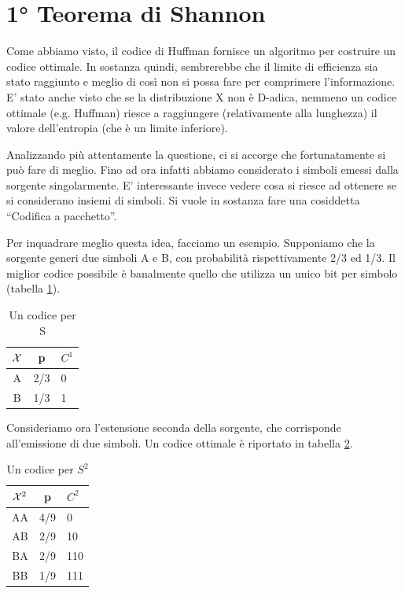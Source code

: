 \section{1° Teorema di Shannon}
Come abbiamo visto, il codice di Huffman fornisce un algoritmo per costruire un codice ottimale.
In sostanza quindi, sembrerebbe che il limite di efficienza sia stato raggiunto e meglio di così non si possa fare per comprimere 
l'informazione. E' stato anche visto che se la distribuzione X non è D-adica, nemmeno un codice ottimale (e.g. Huffman) riesce a raggiungere (relativamente alla lunghezza) il valore dell'entropia (che è un limite inferiore).

Analizzando più attentamente la questione, ci si accorge che fortunatamente si può fare di meglio. Fino ad ora infatti abbiamo 
considerato i simboli emessi dalla sorgente singolarmente. E' interessante invece vedere cosa si riesce ad ottenere se si considerano 
insiemi di simboli. Si vuole in sostanza fare una cosiddetta ``Codifica a pacchetto''.

Per inquadrare meglio questa idea, facciamo un esempio. Supponiamo che la sorgente generi due simboli A e B, con probabilità rispettivamente 2/3 ed 1/3. Il miglior codice possibile è banalmente quello che utilizza un unico bit per simbolo (tabella 
\ref{tab:codpac1}).

\begin{table}[htbp]
  \begin{center}
   \begin{tabular}{c|c l}
	 $\mathcal{X}$ & p  & $C^1$ \\
       \hline
	A & 2/3 & 0  \\ 
	B & 1/3 & 1 \\ 
    \end{tabular}
     \caption{Un codice per S}
    \label{tab:codpac1}
  \end{center}
\end{table}

Consideriamo ora l'estensione seconda della sorgente, che corrisponde all'emissione di due simboli.
Un codice ottimale è riportato in tabella \ref{tab:codpac2}.

\begin{table}[htbp]
  \begin{center}
   \begin{tabular}{c|c l}
	 $\mathcal{X}^2$ & p  & $C^2$ \\
       \hline
	AA & 4/9 & 0  \\ 
	AB & 2/9 & 10 \\
        BA & 2/9 & 110 \\  
        BB & 1/9 & 111 \\ 
    \end{tabular}
     \caption{Un codice per $S^2$}
    \label{tab:codpac2}
  \end{center}
\end{table}

